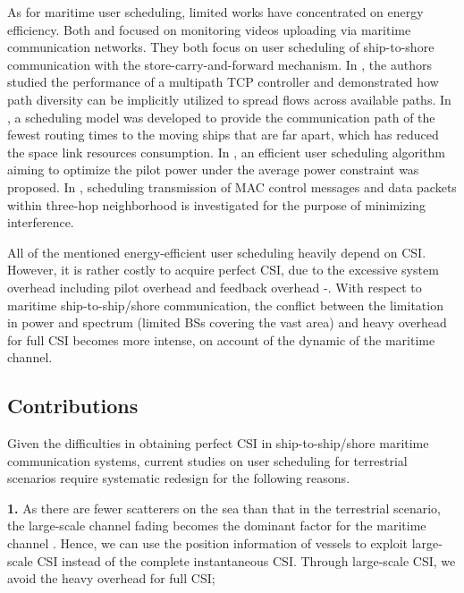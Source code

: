 \documentclass[conference]{IEEEtran}
\begin{document}
As for maritime user scheduling, limited works have concentrated on energy efficiency. Both \cite{p300} and \cite{p301} focused on monitoring videos uploading via maritime communication networks. They both focus on user scheduling of ship-to-shore communication with the store-carry-and-forward mechanism.
In \cite{p302}, the authors studied the performance of a multipath TCP controller and demonstrated how path diversity can be implicitly utilized to spread flows across available paths. 
In \cite{p303}, a scheduling model was developed to provide the communication path of the fewest routing times to the moving ships that are far apart, which has reduced the space link resources consumption. 
In \cite{p400}, an efficient user scheduling algorithm aiming to optimize the pilot power under the average power constraint was proposed. 
In \cite{p402}, scheduling transmission of MAC control messages and data packets within three-hop neighborhood is investigated for the purpose of minimizing interference. 

All of the mentioned energy-efficient user scheduling heavily depend on CSI. However, it is rather costly to acquire perfect CSI, due to the excessive system overhead including pilot overhead and feedback overhead \cite{p403}-\cite{p405}. 
With respect to maritime ship-to-ship/shore communication, the conflict between the limitation in power and spectrum (limited BSs covering the vast area) and heavy overhead for full CSI becomes more intense, on account of the dynamic of the maritime channel.

\subsection{Contributions}

Given the difficulties in obtaining perfect CSI in ship-to-ship/shore maritime communication systems, current studies on user scheduling for terrestrial scenarios require systematic redesign for the following reasons. 

\textbf{1.} As there are fewer scatterers on the sea than that in the terrestrial scenario, the large-scale channel fading becomes the dominant factor for the maritime channel \cite{p403}. Hence, we can use the position information of vessels to exploit large-scale CSI instead of the complete instantaneous CSI. Through large-scale CSI, we avoid the heavy overhead for full CSI; 
\end{document}
